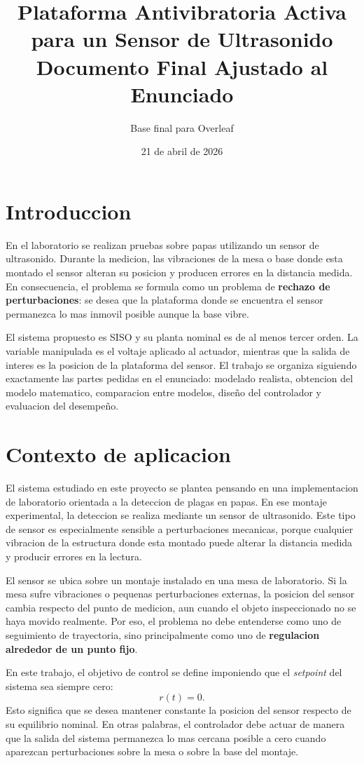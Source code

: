 \documentclass[11pt]{article}
\title{Plataforma Antivibratoria Activa para un Sensor de Ultrasonido\\Documento Final Ajustado al Enunciado}
\author{Base final para Overleaf}
\date{21 de abril de 2026}
\begin{document}
\maketitle
\tableofcontents
\newpage

\section{Introduccion}

En el laboratorio se realizan pruebas sobre papas utilizando un sensor de ultrasonido. Durante la medicion, las vibraciones de la mesa o base donde esta montado el sensor alteran su posicion y producen errores en la distancia medida. En consecuencia, el problema se formula como un problema de \textbf{rechazo de perturbaciones}: se desea que la plataforma donde se encuentra el sensor permanezca lo mas inmovil posible aunque la base vibre.

El sistema propuesto es SISO y su planta nominal es de al menos tercer orden. La variable manipulada es el voltaje aplicado al actuador, mientras que la salida de interes es la posicion de la plataforma del sensor. El trabajo se organiza siguiendo exactamente las partes pedidas en el enunciado: modelado realista, obtencion del modelo matematico, comparacion entre modelos, dise\~no del controlador y evaluacion del desempe\~no.

\section{Contexto de aplicacion}

El sistema estudiado en este proyecto se plantea pensando en una implementacion de laboratorio orientada a la deteccion de plagas en papas. En ese montaje experimental, la deteccion se realiza mediante un sensor de ultrasonido. Este tipo de sensor es especialmente sensible a perturbaciones mecanicas, porque cualquier vibracion de la estructura donde esta montado puede alterar la distancia medida y producir errores en la lectura.

El sensor se ubica sobre un montaje instalado en una mesa de laboratorio. Si la mesa sufre vibraciones o pequenas perturbaciones externas, la posicion del sensor cambia respecto del punto de medicion, aun cuando el objeto inspeccionado no se haya movido realmente. Por eso, el problema no debe entenderse como uno de seguimiento de trayectoria, sino principalmente como uno de \textbf{regulacion alrededor de un punto fijo}.

En este trabajo, el objetivo de control se define imponiendo que el \textit{setpoint} del sistema sea siempre cero:
\[
r(t)=0.
\]
Esto significa que se desea mantener constante la posicion del sensor respecto de su equilibrio nominal. En otras palabras, el controlador debe actuar de manera que la salida del sistema permanezca lo mas cercana posible a cero cuando aparezcan perturbaciones sobre la mesa o sobre la base del montaje.
\end{document}
